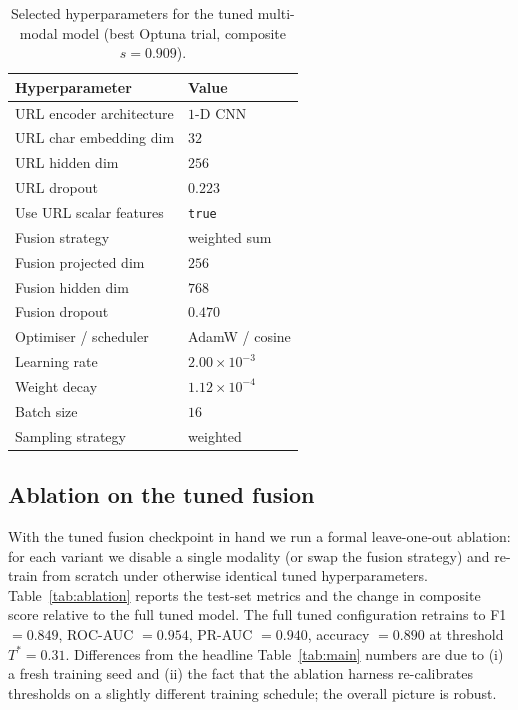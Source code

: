 \documentclass[conference]{IEEEtran}
\begin{document}
\begin{table}[t]
\caption{Selected hyperparameters for the tuned multi-modal model
(best Optuna trial, composite $s=0.909$).}
\label{tab:best_params}
\centering
\begin{tabular}{ll}
\toprule
Hyperparameter & Value \\
\midrule
URL encoder architecture   & $1$-D CNN \\
URL char embedding dim     & $32$ \\
URL hidden dim             & $256$ \\
URL dropout                & $0.223$ \\
Use URL scalar features    & \texttt{true} \\
Fusion strategy            & weighted sum \\
Fusion projected dim       & $256$ \\
Fusion hidden dim          & $768$ \\
Fusion dropout             & $0.470$ \\
Optimiser / scheduler      & AdamW / cosine \\
Learning rate              & $2.00\!\times\!10^{-3}$ \\
Weight decay               & $1.12\!\times\!10^{-4}$ \\
Batch size                 & $16$ \\
Sampling strategy          & weighted \\
\bottomrule
\end{tabular}
\end{table}

\subsection{Ablation on the tuned fusion}
With the tuned fusion checkpoint in hand we run a formal leave-one-out
ablation: for each variant we disable a single modality (or swap the
fusion strategy) and re-train from scratch under otherwise identical
tuned hyperparameters.  Table~\ref{tab:ablation} reports the
test-set metrics and the change in composite score relative to the
full tuned model.  The full tuned configuration retrains to F1
$=0.849$, ROC-AUC $=0.954$, PR-AUC $=0.940$, accuracy $=0.890$ at
threshold $T^{*}=0.31$.  Differences from the headline Table~\ref{tab:main}
numbers are due to (i) a fresh training seed and (ii) the fact that
the ablation harness re-calibrates thresholds on a slightly different
training schedule; the overall picture is robust.
\end{document}
